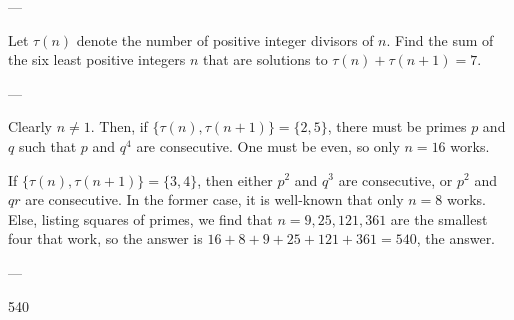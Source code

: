 
---

Let $\tau(n)$ denote the number of positive integer divisors of $n$. Find the sum of the six least positive integers $n$ that are solutions to $\tau(n)+\tau(n+1)=7$.

---

Clearly $n\ne 1$. Then, if $\{\tau(n),\tau(n+1)\}=\{2,5\}$, there must be primes $p$ and $q$ such that $p$ and $q^4$ are consecutive. One must be even, so only $n=16$ works.

If $\{\tau(n),\tau(n+1)\}=\{3,4\}$, then either $p^2$ and $q^3$ are consecutive, or $p^2$ and $qr$ are consecutive. In the former case, it is well-known that only $n=8$ works. Else, listing squares of primes, we find that $n=9,25,121,361$ are the smallest four that work, so the answer is $16+8+9+25+121+361=540$, the answer.

---

540
